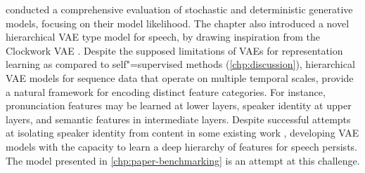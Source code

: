

\vspace{1em}
\textbf{} conducted a comprehensive evaluation of stochastic and deterministic generative models, focusing on their model likelihood. 
The chapter also introduced a novel hierarchical VAE type model for speech, by drawing inspiration from the Clockwork VAE \parencite{saxena_clockwork_2021}. 
Despite the supposed limitations of VAEs for representation learning as compared to self"=supervised methods (\cref{chp:discussion}), hierarchical VAE models for sequence data that operate on multiple temporal scales, provide a natural framework for encoding distinct feature categories. 
For instance, pronunciation features may be learned at lower layers, speaker identity at upper layers, and semantic features in intermediate layers. Despite successful attempts at isolating speaker identity from content in some existing work \parencite{hsu_unsupervised_2017}, developing VAE models with the capacity to learn a deep hierarchy of features for speech persists. The model presented in \cref{chp:paper-benchmarking} is an attempt at this challenge.

